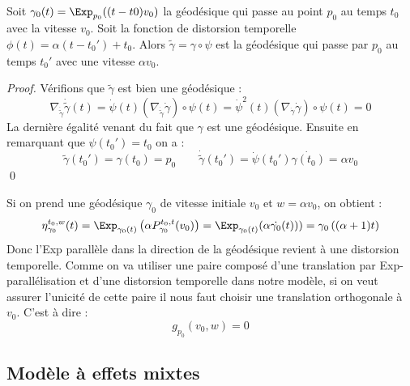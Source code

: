 \begin{proposition}
	Soit $\gamma_0(t) = \Exp_{p_0}((t - t0) v_0)$ la géodésique qui passe au point $p_0$ au temps $t_0$ avec la vitesse $v_0$. Soit la fonction de distorsion temporelle $\phi(t) = \alpha (t - t_0') + t_0$. Alors $\tilde{\gamma} = \gamma \circ \psi$ est la géodésique qui passe par $p_0$ au temps $t_0'$ avec une vitesse $\alpha v_0$.
\end{proposition}

\begin{proof}
	Vérifions que $\tilde{\gamma}$ est bien une géodésique :
	\begin{equation}
		\nabla_{\dot{\tilde{\gamma}}} \dot{\tilde{\gamma}}(t) = \dot{\psi}(t) \left( \nabla_{\dot{\tilde{\gamma}}} \dot{\gamma} \right) \circ \psi(t) = \dot{\psi}^2(t) \left( \nabla_{\dot{\gamma}} \dot{\gamma} \right) \circ \psi(t) = 0
	\end{equation}
	La dernière égalité venant du fait que $\gamma$ est une géodésique. Ensuite en remarquant que $\psi(t_0') = t_0$ on a :
	\begin{equation}
		\tilde{\gamma}(t_0') = \gamma(t_0) = p_0 \qquad \dot{\tilde{\gamma}}(t_0') = \dot{\psi}(t_0') \dot{\gamma(t_0)} = \alpha v_0
	\end{equation}
	\qed
\end{proof}

\begin{remarque}
	\label{rk:ortho_vw}
	Si on prend une géodésique $\gamma_0$ de vitesse initiale $v_0$ et $w = \alpha v_0$, on obtient :
	\begin{equation}
		\eta_{\gamma_0}^{t_0, w}(t) = \Exp_{\gamma_0(t)} \left( \alpha P_{\gamma_0}^{t_0,t}(v_0) \right) = \Exp_{\gamma_0(t)}(\alpha \dot{\gamma_0}(t))) = \gamma_0 \left( (\alpha + 1) t \right)
	\end{equation}
	Donc l'Exp parallèle dans la direction de la géodésique revient à une distorsion temporelle. Comme on va utiliser une paire composé d'une translation par Exp-parallélisation et d'une distorsion temporelle dans notre modèle, si on veut assurer l'unicité de cette paire il nous faut choisir une translation orthogonale à $v_0$. C'est à dire :
	\begin{equation}
		\label{eq:ortho_vw}
		g_{p_0}(v_0, w) = 0
	\end{equation}
\end{remarque}

\subsection{Modèle à effets mixtes}

